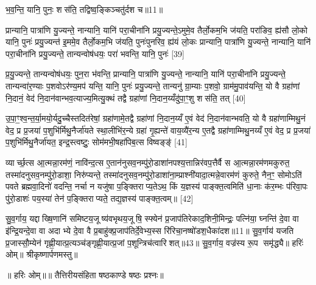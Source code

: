 {\scriptsize {भ॒व॒न्ति॒ यानि॒ पुनः॒ शस॑ति॒ तद्विष्व॒ङ्किञ्चतु॑र्दश च॥11॥}}

प्रान्यानि॒ पात्रा॑णि यु॒ज्यन्ते॒ नान्यानि॒ यानि॑ परा॒चीना॑नि प्रयु॒ज्यन्ते॒ऽमुमे॒व तैर्लो॒कम॒भि ज॑यति॒ परा॑ङिव॒ ह्य॑सौ लो॒को यानि॒ पुनः॑ प्रयु॒ज्यन्त॑ इ॒ममे॒व तैर्लो॒कम॒भि ज॑यति॒ पुनः॑पुनरिव॒ ह्य॑यं लो॒कः प्रान्यानि॒ पात्रा॑णि यु॒ज्यन्ते॒ नान्यानि॒ यानि॑ परा॒चीना॑नि प्रयु॒ज्यन्ते॒ तान्यन्वोष॑धयः॒ परा॑ भवन्ति॒ यानि॒ पुनः॑ [39]

प्र॒यु॒ज्यन्ते॒ तान्यन्वोष॑धयः॒ पुन॒रा भ॑वन्ति॒ प्रान्यानि॒ पात्रा॑णि यु॒ज्यन्ते॒ नान्यानि॒ यानि॑ परा॒चीना॑नि प्रयु॒ज्यन्ते॒ तान्यन्वा॑र॒ण्याः प॒शवोऽर॑ण्य॒मप॑ यन्ति॒ यानि॒ पुनः॑ प्रयु॒ज्यन्ते॒ तान्यनु॑ ग्रा॒म्याः प॒शवो॒ ग्राम॑मु॒पाव॑यन्ति॒ यो वै ग्रहा॑णां नि॒दानं॒ वेद॑ नि॒दान॑वान्भव॒त्याज्य॒मित्यु॒क्थं तद्वै ग्रहा॑णां नि॒दान॒य्यँदु॑पा॒ꣳ॒शु शस॑ति॒ तत् [40]

उ॒पा॒ꣳ॒श्व॒न्त॒र्या॒मयो॒र्यदु॒च्चैस्तदित॑रेषां॒ ग्रहा॑णामे॒तद्वै ग्रहा॑णां नि॒दान॒य्यँ ए॒वं वेद॑ नि॒दान॑वान्भवति॒ यो वै ग्रहा॑णाम्मिथु॒नं वेद॒ प्र प्र॒जया॑ प॒शुभि॑र्मिथु॒नैर्जा॑यते स्था॒लीभि॑र॒न्ये ग्रहा॑ गृ॒ह्यन्ते॑ वाय॒व्यै॑र॒न्य ए॒तद्वै ग्रहा॑णाम्मिथु॒नय्यँ ए॒वं वेद॒ प्र प्र॒जया॑ प॒शुभि॑र्मिथु॒नैर्जा॑यत॒ इन्द्र॒स्त्वष्टुः॒ सोम॑मभी॒षहा॑पिब॒त्स विष्वङ्ङ्॑ [41]

व्यार्च्छ॒त्स आ॒त्मन्ना॒रम॑णं॒ नावि॑न्द॒त्स ए॒तान॑नुसव॒नम्पु॑रो॒डाशा॑नपश्य॒त्तान्निर॑वप॒त्तैर्वै स आ॒त्मन्ना॒रम॑णमकुरुत॒ तस्मा॑दनुसव॒नम्पु॑रो॒डाशा॒ निरु॑प्यन्ते॒ तस्मा॑दनुसव॒नम्पु॑रो॒डाशा॑ना॒म्प्राश्नी॑यादा॒त्मन्ने॒वारम॑णं कुरुते॒ नैन॒ꣳ॒ सोमोऽति॑ पवते ब्रह्मवा॒दिनो॑ वदन्ति॒ नर्चा न यजु॑षा प॒ङ्क्तिराप्य॒तेऽथ॒ किं य॒ज्ञस्य॑ पाङ्क्त॒त्वमिति॑ धा॒नाः क॑र॒म्भः प॑रिवा॒पः पु॑रो॒डाशः॑ पय॒स्या॑ तेन॑ प॒ङ्क्तिराप्यते॒ तद्य॒ज्ञस्य॑ पाङ्क्त॒त्वम्॥ [42]

{\scriptsize {सु॒व॒र्गाय॒ यद्दाख्षि॒णानि॑ समिष्टय॒जूष्य॑वभृथय॒जूषि॒ स्फ्येन॑ प्र॒जाप॑तिरेकाद॒शिनी॒मिन्द्रः॒ पत्नि॑या॒ घ्नन्ति॑ दे॒वा वा इ॑न्द्रि॒यन्दे॒वा वा अदाभ्ये दे॒वा वै प्र॒बाहु॑क्प्र॒जाप॑तिर्दे॒वेभ्य॒स्स रि॑रिचा॒नष्षो॑डश॒धैका॑दश॥11॥ सु॒व॒र्गाय॑ यजति प्र॒जास्सौ॒म्येन॑ गृह्णी॒यात्प्र॒त्यञ्च॑ङ्गृह्णी॒यात्प्र॒जां प॒शून्त्रिच॑त्वारिशत्॥43॥ सु॒व॒र्गाय॒ वज्र॑स्य रू॒प समृ॑द्ध्यै॥ हरिः॑ ओम्॥ श्रीकृष्णार्पणमस्तु॥}}

{\scriptsize {॥ हरिः ओम्॥॥ तैत्तिरीयसंहिता षष्ठकाण्डे षष्ठः प्रश्नः॥}}


